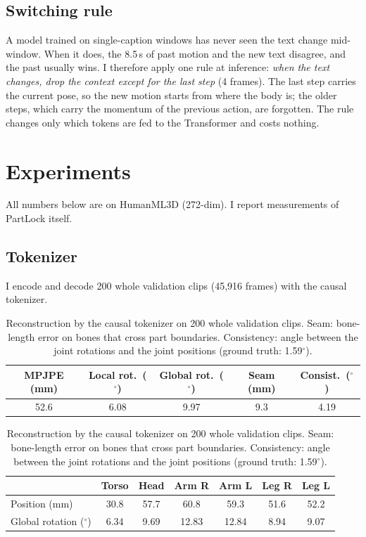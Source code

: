 \documentclass[11pt]{article}
\begin{document}
\subsection{Switching rule}
\label{sec:switch}
A model trained on single-caption windows has never seen the text change mid-window.
When it does, the 8.5\,s of past motion and the new text disagree, and the past usually wins.
I therefore apply one rule at inference: \emph{when the text changes, drop the context except for the
last step} (4 frames).
The last step carries the current pose, so the new motion starts from where the body is;
the older steps, which carry the momentum of the previous action, are forgotten.
The rule changes only which tokens are fed to the Transformer and costs nothing.

\section{Experiments}

All numbers below are on HumanML3D (272-dim). I report measurements of PartLock itself.

\subsection{Tokenizer}
I encode and decode 200 whole validation clips (45,916 frames) with the causal tokenizer.

\begin{table}[h]
\centering
\caption{Reconstruction by the causal tokenizer on 200 whole validation clips.
Seam: bone-length error on bones that cross part boundaries.
Consistency: angle between the joint rotations and the joint positions (ground truth: 1.59$^\circ$).}
\label{tab:tok}
\begin{tabular}{ccccc}
\toprule
MPJPE (mm) & Local rot.\ ($^\circ$) & Global rot.\ ($^\circ$) & Seam (mm) & Consist.\ ($^\circ$)\\
\midrule
52.6 & 6.08 & 9.97 & 9.3 & 4.19\\
\bottomrule
\end{tabular}

\vspace{6pt}
\begin{tabular}{lcccccc}
\toprule
 & Torso & Head & Arm R & Arm L & Leg R & Leg L\\
\midrule
Position (mm) & 30.8 & 57.7 & 60.8 & 59.3 & 51.6 & 52.2\\
Global rotation ($^\circ$) & 6.34 & 9.69 & 12.83 & 12.84 & 8.94 & 9.07\\
\bottomrule
\end{tabular}
\end{table}
\end{document}
